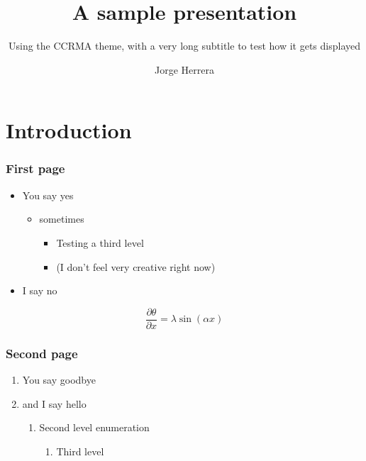 \documentclass{beamer}
\title{A sample presentation}
\subtitle{Using the CCRMA theme, with a very long subtitle to test how it gets displayed}
\author{Jorge Herrera}
\date
\begin{document}
\begin{frame}[plain]
\titlepage
\end{frame}
\addtocounter{framenumber}{-1}  %


\begin{frame}[plain]
    \tableofcontents
\end{frame}

\section[Intro]{Introduction}
\begin{frame}[plain]
    \tableofcontents[currentsection]
\end{frame}

\begin{frame}\frametitle{First page}
    \begin{itemize}
    \item You say yes
        \begin{itemize}
        \item sometimes
            \begin{itemize}
            \item Testing a third level
            \item (I don't feel very creative right now)
            \end{itemize}
        \end{itemize}
    \item I say no
    \end{itemize}

    \begin{equation}
    \frac{\partial \theta}{\partial x} = \lambda \sin(\alpha x)
    \end{equation}

\end{frame}

\begin{frame}\frametitle{Second page}
    \begin{enumerate}
    \item You say goodbye
    \item and I say hello
        \begin{enumerate}
        \item Second level enumeration
            \begin{enumerate}
            \item Third level
            \end{enumerate}
        \end{enumerate}
    \end{enumerate}
\end{frame}
\end{document}
